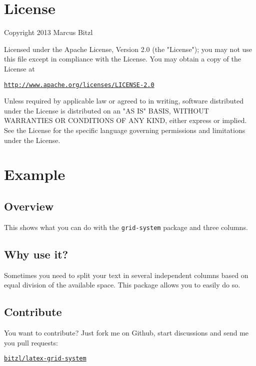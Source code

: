 \documentclass[DIV13]{scrartcl}
\begin{document}
\section{License}
Copyright 2013 Marcus Bitzl

\medskip

Licensed under the Apache License, Version 2.0 (the "License");
you may not use this file except in compliance with the License.
You may obtain a copy of the License at

\medskip

\hspace*{1.2em}\href{http://www.apache.org/licenses/LICENSE-2.0}{\texttt{http://www.apache.org/licenses/LICENSE-2.0}}

\medskip

Unless required by applicable law or agreed to in writing, software
distributed under the License is distributed on an "AS IS" BASIS,
WITHOUT WARRANTIES OR CONDITIONS OF ANY KIND, either express or implied.
See the License for the specific language governing permissions and
limitations under the License.


\section{Example}
\begin{row}[cellsep=0.75cm]{3}{3}
	\begin{cell}{1}
	\section*{Overview}
	\vspace{-1.5ex}
	This shows what you can do with the \texttt{grid-system} package and three columns.
	\end{cell}
	\begin{cell}{1}
	\section*{Why use it?}
	\vspace{-1.5ex}
	Sometimes you need to split your text in several independent columns based on equal division of the available space. This package allows you to easily do so.
	\end{cell}
	\begin{cell}{1}
	\section*{Contribute}
	\vspace{-1.5ex}
	You want to contribute? Just fork me on Github, start discussions and send me you pull requests: 
	\begin{center}
	\href{https://github.com/bitzl/latex-grid-system}{\tt bitzl/latex-grid-system}
	\end{center}
	\end{cell}
\end{row}
\end{document}
